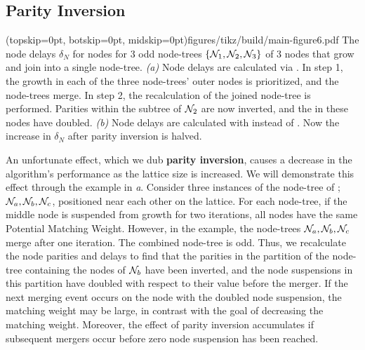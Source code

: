 \subsection{Parity Inversion}\label{sec:inversion}

\Figure[tb](topskip=0pt, botskip=0pt, midskip=0pt){figures/tikz/build/main-figure6.pdf}{
    The node delays $\delta_N$ for nodes for 3 odd node-trees $\{\mathcal{N}_1, \mathcal{N}_2, \mathcal{N}_3\}$ of 3 nodes that grow and join into a single node-tree. \emph{(a)} Node delays are calculated via . In step 1, the growth in each of the three node-trees' outer nodes is prioritized, and the node-trees merge. In step 2, the recalculation of the joined node-tree is performed. Parities within the subtree of $\mathcal{N}_2$ are now inverted, and the  in these nodes have doubled. \emph{(b)} Node delays are calculated with  instead of . Now the increase in $\delta_N$ after parity inversion is halved.\label{fig:partialdfs}}

An unfortunate effect, which we dub \textbf{parity inversion}, causes a decrease in the algorithm's performance as the lattice size is increased. We will demonstrate this effect through the example in \emph{a}. Consider three instances of the node-tree of ; $\mathcal{N}_a, \mathcal{N}_b, \mathcal{N}_c$, positioned near each other on the lattice. For each node-tree, if the middle node is suspended from growth for two iterations, all nodes have the same Potential Matching Weight. However, in the example, the node-trees $\mathcal{N}_a, \mathcal{N}_b, \mathcal{N}_c$ merge after one iteration. The combined node-tree is odd. Thus, we recalculate the node parities and delays to find that the parities in the partition of the node-tree containing the nodes of $\mathcal{N}_b$ have been inverted, and the node suspensions in this partition have doubled with respect to their value before the merger. If the next merging event occurs on the node with the doubled node suspension, the matching weight may be large, in contrast with the goal of decreasing the matching weight. Moreover, the effect of parity inversion accumulates if subsequent mergers occur before zero node suspension has been reached. %

